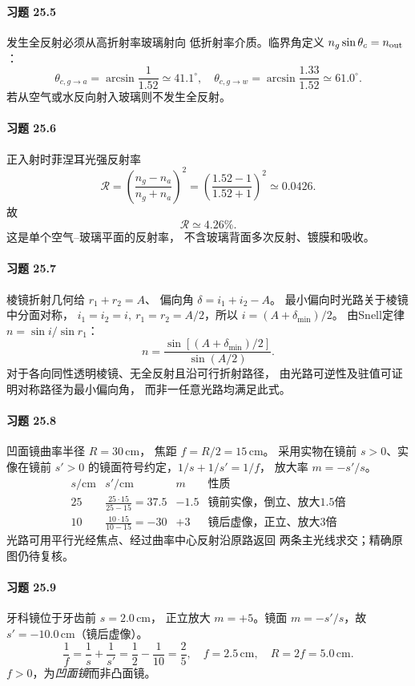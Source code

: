 \paragraph{习题 25.5}
发生全反射必须从高折射率玻璃射向
低折射率介质。临界角定义
\(n_g\sin\theta_c=n_{\rm out}\)：
\[
\boxed{\theta_{c,g\to a}=\arcsin\frac1{1.52}
\simeq41.1^\circ},\quad
\boxed{\theta_{c,g\to w}=\arcsin\frac{1.33}{1.52}
\simeq61.0^\circ}.
\]
若从空气或水反向射入玻璃则不发生全反射。

\paragraph{习题 25.6}
正入射时菲涅耳光强反射率
\[
\mathcal R=\left(\frac{n_g-n_a}{n_g+n_a}\right)^2
=\left(\frac{1.52-1}{1.52+1}\right)^2
\simeq0.0426.
\]
故
\[
\boxed{\mathcal R\simeq4.26\%}.
\]
这是单个空气--玻璃平面的反射率，
不含玻璃背面多次反射、镀膜和吸收。

\paragraph{习题 25.7}
棱镜折射几何给 \(r_1+r_2=A\)、
偏向角 \(\delta=i_1+i_2-A\)。
最小偏向时光路关于棱镜中分面对称，
\(i_1=i_2=i,\ r_1=r_2=A/2\)，所以
\(i=(A+\delta_{\min})/2\)。
由Snell定律 \(n=\sin i/\sin r_1\)：
\[
\boxed{n=\frac{\sin[(A+\delta_{\min})/2]}{\sin(A/2)}}.
\]
对于各向同性透明棱镜、无全反射且沿可行折射路径，
由光路可逆性及驻值可证明对称路径为最小偏向角，
而非一任意光路均满足此式。

\paragraph{习题 25.8}
凹面镜曲率半径 \(R=30\,\mathrm{cm}\)，
焦距 \(f=R/2=15\,\mathrm{cm}\)。
采用实物在镜前 \(s>0\)、实像在镜前 \(s'>0\)
的镜面符号约定，\(1/s+1/s'=1/f\)，
放大率 \(m=-s'/s\)。
\[
\begin{array}{c|c|c|l}
s/\mathrm{cm}&s'/\mathrm{cm}&m&\text{性质}\\\hline
25&\frac{25\cdot15}{25-15}=37.5&-1.5&
\text{镜前实像，倒立、放大1.5倍}\\
10&\frac{10\cdot15}{10-15}=-30&+3&
\text{镜后虚像，正立、放大3倍}
\end{array}
\]
光路可用平行光经焦点、经过曲率中心反射沿原路返回
两条主光线求交；精确原图仍待复核。

\paragraph{习题 25.9}
牙科镜位于牙齿前 \(s=2.0\,\mathrm{cm}\)，
正立放大 \(m=+5\)。镜面 \(m=-s'/s\)，故
\(s'=-10.0\,\mathrm{cm}\)（镜后虚像）。
\[
\frac1f=\frac1s+\frac1{s'}
=\frac12-\frac1{10}=\frac25,
\quad
\boxed{f=2.5\,\mathrm{cm}},\quad
\boxed{R=2f=5.0\,\mathrm{cm}}.
\]
\(f>0\)，为\emph{凹面镜}而非凸面镜。

